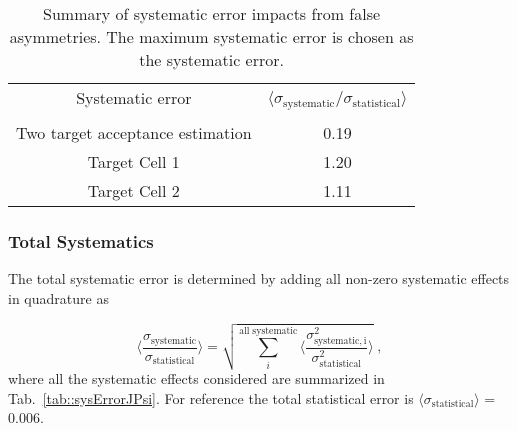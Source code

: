 \begin{table}[h!t]
  \centering
  \begin{tabular}{|c|c|}
    \hline Systematic error& \multirow{2}{9em}{$\langle
      \sigma_{\mathrm{systematic}}/\sigma_{\mathrm{statistical}}
      \rangle$}\\ & \\ \hline

    Two target acceptance estimation& 0.19\\ \hline
    
    Target Cell 1& 1.20\\ \hline

    Target Cell 2& 1.11\\ \hline
    
  \end{tabular}
  \caption{Summary of systematic error impacts from false asymmetries.  The
    maximum systematic error is chosen as the systematic error.}
  \label{tab::faSysJPsi}
\end{table}

\subsubsection{Total Systematics}
The total systematic error is determined by adding all non-zero systematic
effects in quadrature as

\begin{equation}
  \Big \langle \frac{
    \sigma_{\mathrm{systematic}}}{\sigma_{\mathrm{statistical}}} \Big \rangle =
  \sqrt{ \sum_i^{\mathrm{all \; systematic}} \Big \langle
    \frac{\sigma^2_{\mathrm{systematic, i}}}{\sigma^2_{\mathrm{statistical}}}
    \Big \rangle } \;,
\end{equation}
where all the systematic effects considered are summarized in
Tab.~\ref{tab::sysErrorJPsi}.  For reference the total statistical error is
$\langle \sigma_{\mathrm{statistical}} \rangle$ = 0.006.

